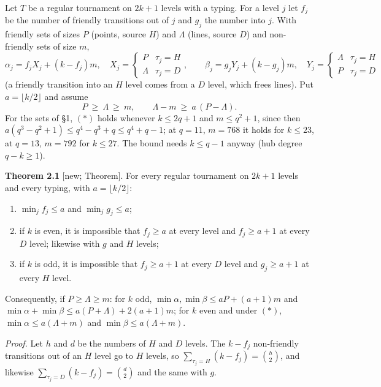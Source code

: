 \documentclass[
  10pt,
]{article}
\begin{document}
Let \(T\) be a regular tournament on \(2k+1\) levels with a typing. For
a level \(j\) let \(f_j\) be the number of friendly transitions out of
\(j\) and \(g_j\) the number into \(j\). With friendly sets of sizes
\(P\) (points, source \(H\)) and \(\Lambda\) (lines, source \(D\)) and
non-friendly sets of size \(m\),
\[\alpha_j=f_jX_j+(k-f_j)m,\quad X_j=\begin{cases}P&\tau_j=H\\ \Lambda&\tau_j=D\end{cases},\qquad
\beta_j=g_jY_j+(k-g_j)m,\quad Y_j=\begin{cases}\Lambda&\tau_j=H\\ P&\tau_j=D\end{cases}\]
(a friendly transition into an \(H\) level comes from a \(D\) level,
which frees lines). Put \(a=\lfloor k/2\rfloor\) and assume
\[P\ \ge\ \Lambda\ \ge\ m,\qquad \Lambda-m\ \ge\ a\,(P-\Lambda).\tag{$\ast$}\]
For the sets of §1, \((\ast)\) holds whenever \(k\le 2q+1\) and
\(m\le q^2+1\), since then \(a(q^3-q^2+1)\le q^4-q^3+q\le q^4+q-1\); at
\(q=11\), \(m=768\) it holds for \(k\le23\), at \(q=13\), \(m=792\) for
\(k\le27\). The bound needs \(k\le q-1\) anyway (hub degree
\(q-k\ge1\)).

\textbf{Theorem 2.1} {[}new; Theorem{]}. For every regular tournament on
\(2k+1\) levels and every typing, with \(a=\lfloor k/2\rfloor\):

\begin{enumerate}
\def\labelenumi{(\alph{enumi})}
\item
  \(\min_jf_j\le a\) and \(\min_jg_j\le a\);
\item
  if \(k\) is even, it is impossible that \(f_j\ge a\) at every level
  and \(f_j\ge a+1\) at every \(D\) level; likewise with \(g\) and \(H\)
  levels;
\item
  if \(k\) is odd, it is impossible that \(f_j\ge a+1\) at every \(D\)
  level and \(g_j\ge a+1\) at every \(H\) level.
\end{enumerate}

Consequently, if \(P\ge\Lambda\ge m\): for \(k\) odd,
\(\min\alpha,\min\beta\le aP+(a+1)m\) and
\(\min\alpha+\min\beta\le a(P+\Lambda)+2(a+1)m\); for \(k\) even and
under \((\ast)\), \(\min\alpha\le a(\Lambda+m)\) and
\(\min\beta\le a(\Lambda+m)\).

\emph{Proof.} Let \(h\) and \(d\) be the numbers of \(H\) and \(D\)
levels. The \(k-f_j\) non-friendly transitions out of an \(H\) level go
to \(H\) levels, so \(\sum_{\tau_j=H}(k-f_j)=\binom h2\), and likewise
\(\sum_{\tau_j=D}(k-f_j)=\binom d2\) and the same with \(g\).
\end{document}
